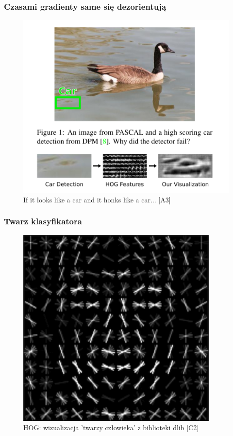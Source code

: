 \documentclass{beamer}
\begin{document}
            \begin{frame}
                \frametitle{Czasami gradienty same się dezorientują}
                \begin{center}
                    \begin{figure}
                        \includegraphics[height=0.75\textheight]{pictures/vondrick_duck.png}
                        \caption{If it looks like a car and it honks like a car... [A3]}
                    \end{figure}
                \end{center}
            \end{frame}

            \begin{frame}
                \frametitle{Twarz klasyfikatora}
                \begin{center}
                    \begin{figure}
                        \includegraphics[height=0.75\textheight]{pictures/hog.png}
                        \caption{HOG: wizualizacja 'twarzy człowieka' z biblioteki dlib [C2]}
                    \end{figure}
                \end{center}
            \end{frame}
\end{document}
